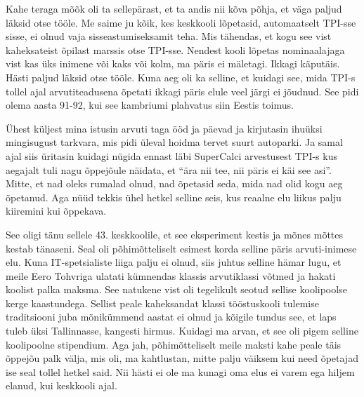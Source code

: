 Kahe teraga mõõk oli ta sellepärast, et ta andis nii kõva põhja, et väga paljud 
läksid otse tööle. Me saime ju kõik, kes keskkooli lõpetasid,  
automaatselt TPI-sse sisse,  ei olnud vaja sisseastumiseksamit teha. Mis 
tähendas, et kogu see vist kaheksateist õpilast marssis otse TPI-sse. Nendest 
kooli lõpetas nominaalajaga vist  kas üks inimene või kaks või kolm, ma päris 
ei mäletagi. Ikkagi käputäis. Hästi paljud läksid otse tööle. Kuna aeg oli ka 
selline, et kuidagi see, mida TPI-s tollel ajal arvutiteadusena õpetati 
ikkagi päris elule veel järgi ei jõudnud. See pidi olema aasta 91-92, kui 
see kambriumi plahvatus siin Eestis toimus.

Ühest küljest  mina istusin arvuti taga ööd ja päevad ja kirjutasin 
ihuüksi  mingisugust tarkvara, mis pidi 
üleval hoidma tervet suurt autoparki. Ja samal ajal siis üritasin kuidagi nügida 
ennast läbi SuperCalci arvestusest TPI-s kus 
aegajalt tuli nagu õppejõule näidata, et \enquote{ära nii tee, nii päris ei käi see asi}. 
Mitte, et nad oleks rumalad olnud, nad õpetasid seda, mida nad olid kogu 
aeg õpetanud. Aga nüüd tekkis ühel hetkel selline seis, kus reaalne elu liikus 
palju kiiremini kui õppekava.


See oligi tänu sellele 43. keskkoolile, et see eksperiment kestis ja mõnes mõttes kestab tänaseni. Seal oli 
põhimõtteliselt  esimest korda selline päris arvuti-inimese elu. Kuna 
IT-spetsialiste  liiga palju ei olnud, siis juhtus selline hämar lugu, et meile 
Eero Tohvriga ulatati kümnendas klassis arvutiklassi võtmed ja hakati 
koolist palka maksma. See natukene vist oli tegelikult seotud 
sellise koolipoolse kerge kaastundega. Sellist  peale 
kaheksandat klassi tööstuskooli tulemise traditsiooni juba mõnikümmend aastat ei olnud ja kõigile tundus see, et laps tuleb üksi Tallinnasse, kangesti 
hirmus. Kuidagi ma arvan, et see oli pigem selline koolipoolne stipendium. 
Aga jah, põhimõtteliselt meile maksti kahe peale täis õppejõu palk välja, mis 
oli, ma kahtlustan, mitte palju väiksem kui need õpetajad 
ise seal tollel hetkel said. Nii hästi ei ole ma kunagi oma elus ei varem ega 
hiljem elanud, kui keskkooli ajal. 



